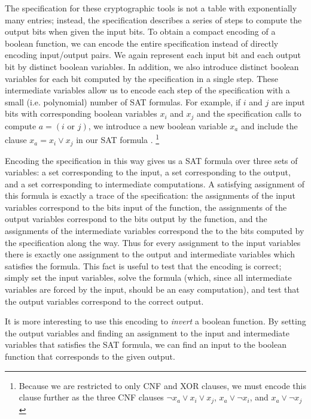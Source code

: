 The specification for these cryptographic tools is not a table with exponentially many entries; instead, the specification describes a series of steps to compute the output bits when given the input bits. To obtain a compact encoding of a boolean function, we can encode the entire specification instead of directly encoding input/output pairs. We again represent each input bit and each output bit by distinct boolean variables. In addition, we also introduce distinct boolean variables for each bit computed by the specification in a single step. These intermediate variables allow us to encode each step of the specification with a small (i.e. polynomial) number of SAT formulas. For example, if $i$ and $j$ are input bits with corresponding boolean variables $x_i$ and $x_j$ and the specification calls to compute $a = (i \text{ or } j)$, we introduce a new boolean variable $x_a$ and include the clause $x_a = x_i \lor x_j$ in our SAT formula . \footnote{Because we are restricted to only CNF and XOR clauses, we must encode this clause further as the three CNF clauses $\neg x_a \lor x_i \lor x_j$, $x_a \lor \neg x_i$, and $x_a \lor \neg x_j$}

Encoding the specification in this way gives us a SAT formula over three sets of variables: a set corresponding to the input, a set corresponding to the output, and a set corresponding to intermediate computations. A satisfying assignment of this formula is exactly a trace of the specification: the assignments of the input variables correspond to the bits input of the function, the assignments of the output variables correspond to the bits output by the function, and the assignments of the intermediate variables correspond the to the bits computed by the specification along the way. Thus for every assignment to the input variables there is exactly one assignment to the output and intermediate variables which satisfies the formula. This fact is useful to test that the encoding is correct; simply set the input variables, solve the formula (which, since all intermediate variables are forced by the input, should be an easy computation), and test that the output variables correspond to the correct output.

It is more interesting to use this encoding to \emph{invert} a boolean function. By setting the output variables and finding an assignment to the input and intermediate variables that satisfies the SAT formula, we can find an input to the boolean function that corresponds to the given output.